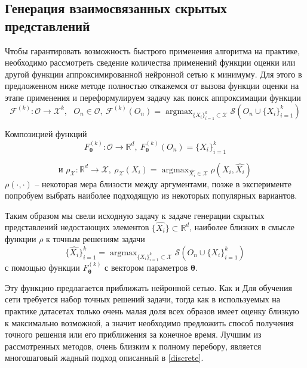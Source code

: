 \documentclass[a4paper,14pt]{extarticle}
\DeclareMathOperator*{\argmax}{argmax}
\begin{document}
			\subsection{Генерация взаимосвязанных скрытых представлений}\label{generation}
			Чтобы гарантировать возможность быстрого применения алгоритма на практике, необходимо рассмотреть сведение количества применений функции оценки или другой функции аппроксимированной нейронной сетью к минимуму. Для этого в предложенном ниже методе полностью откажемся от вызова функции оценки на этапе применения и переформулируем задачу как поиск аппроксимации функции 
			$$\mathcal{F}^{(k)}: \mathcal{O}\longrightarrow \mathcal{X}^k, ~~~O_n\in \mathcal{O},~ \mathcal{F}^{(k)}(O_n) = \argmax_{\{X_i\}_{i=1}^k\subset\mathcal{X}} \mathcal{S}\left(O_n\cup\{X_i\}_{i=1}^k\right)$$
			
			Композицией функций 
			$$F^{(k)}_\mathbf{\theta}: \mathcal{O}\longrightarrow \mathbb{R}^d, ~F^{(k)}_\mathbf{\theta}(O_n) = \{X_i\}_{i=1}^k$$
			
			 $$\text{и }\rho_\mathcal{X}: \mathbb{R}^d\longrightarrow \mathcal{X}, ~ \rho_\mathcal{X}(X_i) = \argmax_{\hat{X_i}\in\mathcal{X}}\rho(X_i, \hat{X_i})$$
			$\rho(\cdot, \cdot)$ -- некоторая мера близости между аргументами, позже в эксперименте попробуем выбрать наиболее подходящую из некоторых популярных вариантов.
			 
			Таким образом мы свели исходную задачу к задаче генерации скрытых представлений недостающих элементов $\{\hat{X_i}\}\subset \mathbb{R}^d$, наиболее близких в смысле функции $\rho$ к точным решениям задачи
			$$\{\hat{X_i}\}_{i=1}^k= \argmax_{\{X_i\}_{i=1}^k\subset\mathcal{X}} \mathcal{S}\left(O_n\cup\{X_i\}_{i=1}^k\right)$$
			с помощью функции  $F^{(k)}_\mathbf{\theta}$ с вектором параметров $\mathbf{\theta}$. 
			
			Эту функцию предлагается приближать нейронной сетью. Как и 
			Для обучения сети требуется набор точных решений задачи, тогда как в используемых на практике датасетах только очень малая доля всех образов имеет оценку близкую к максимально возможной, а значит необходимо предложить способ получения точного решения или его приближения за конечное время. Лучшим из рассмотренных методов, очень близким к полному перебору, является многошаговый жадный подход описанный в \ref{discrete}. 
			
\end{document}
